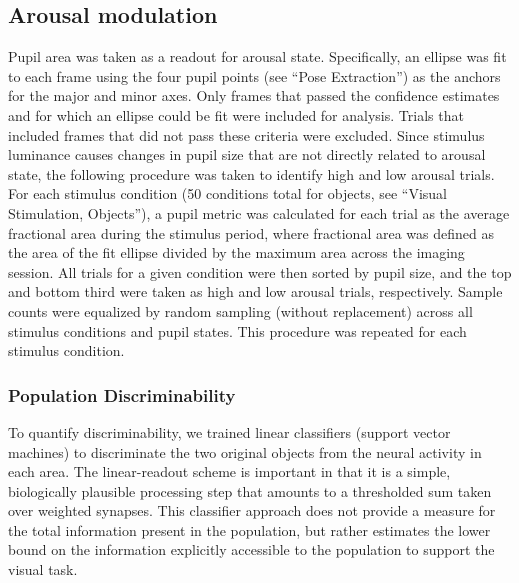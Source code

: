 \subsection{Arousal modulation}
Pupil area was taken as a readout for arousal state. Specifically, an ellipse was fit to each frame using the four pupil points (see ``Pose Extraction'') as the anchors for the major and minor axes. Only frames that passed the confidence estimates and for which an ellipse could be fit were included for analysis. Trials that included frames that did not pass these criteria were excluded. Since stimulus luminance causes changes in pupil size that are not directly related to arousal state, the following procedure was taken to identify high and low arousal trials. For each stimulus condition (50 conditions total for objects, see ``Visual Stimulation, Objects''), a pupil metric was calculated for each trial as the average fractional area during the stimulus period, where fractional area was defined as the area of the fit ellipse divided by the maximum area across the imaging session. All trials for a given condition were then sorted by pupil size, and the top and bottom third were taken as high and low arousal trials, respectively. Sample counts were equalized by random sampling (without replacement) across all stimulus conditions and pupil states. This procedure was repeated for each stimulus condition. 

\subsubsection{Population Discriminability}
To quantify discriminability, we trained linear classifiers (support vector machines) to discriminate the two original objects from the neural activity in each area. The linear-readout scheme is important in that it is a simple, biologically plausible processing step that amounts to a thresholded sum taken over weighted synapses. This classifier approach does not provide a measure for the total information present in the population, but rather estimates the lower bound on the information explicitly accessible to the population to support the visual task\cite{Hung2005, Rust2010SelectivityIT}.

